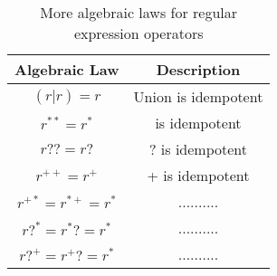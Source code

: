 \begin{table}[t]
\centering
\begin{tabular}{@{}c c@{}}
\toprule
Algebraic Law      & \quad Description     \\ \midrule
\((r|r) = r\)      & \quad Union is idempotent \\
\(r^{**} = r^*\)   & \quad * is idempotent \\
\(r?? = r?\)       & \quad ? is idempotent \\
\(r^{++} = r^+\)   & \quad + is idempotent \\

\(r^{+*} = r^{*+} = r^*\)  & \quad .......... \\
\(r?^* = r^*? = r^*\)      & \quad .......... \\
\(r?^+ = r^+? = r^*\)      & \quad .......... \\\bottomrule
\end{tabular}
\caption{More algebraic laws for regular expression operators}
\label{tab:more-regex-laws}
\end{table}